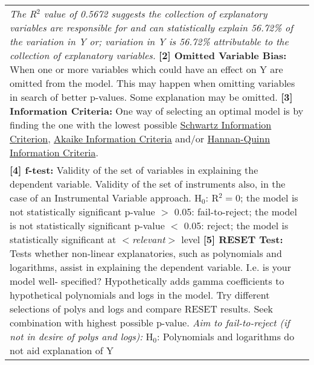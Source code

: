 \documentclass[11pt, english]{article}
\begin{document}
\begin{center}
\begin{longtable}{p{14cm}}
                \textit{The R$^2$ value of 0.5672 suggests the collection of explanatory variables are responsible for and can statistically explain 56.72\% of the variation in Y or; variation in Y is 56.72\% attributable to the collection of explanatory variables.}\newline\newline
                \textbf{[2] Omitted Variable Bias: }When one or more variables which could have an effect on Y are omitted from the model. This may happen when omitting variables in search of better p-values. Some explanation may be omitted.\newline\newline
                \textbf{[3] Information Criteria: }One way of selecting an optimal model is by finding the one with the lowest possible \underline{Schwartz Information Criterion}, \underline{Akaike Information Criteria} and/or \underline{Hannan-Quinn Information Criteria}.\\
                \textbf{[4] f-test: }Validity of the set of variables in explaining the dependent variable. Validity of the set of instruments also, in the case of an Instrumental Variable approach.\newline\newline
                H$_0$: R$^2=0$; the model is not statistically significant\newline\newline
                p-value $>$ 0.05: fail-to-reject; the model is not statistically significant\newline
                p-value $<$ 0.05: reject; the model is statistically significant at $<$\textit{relevant}$>$ level\newline\newline
                \textbf{[5] RESET Test: }Tests whether non-linear explanatories, such as polynomials and logarithms, assist in explaining the dependent variable. I.e. is your model well- specified? Hypothetically adds gamma coefficients to hypothetical polynomials and logs in the model. Try different selections of polys and logs and compare RESET results. Seek combination with highest possible p-value.\newline\newline
                \textit{Aim to fail-to-reject (if not in desire of polys and logs):}\newline
                H$_0$: Polynomials and logarithms do not aid explanation of Y\newline\newline

\end{longtable}
\end{center}
\end{document}
